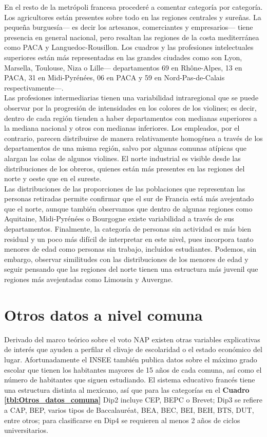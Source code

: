  En el resto de la metrópoli francesa procederé a comentar categoría por categoría. Los agricultores están presentes sobre todo en las regiones centrales y sureñas. La pequeña burguesía--- es decir los artesanos, comerciantes y empresarios--- tiene presencia en general nacional, pero resaltan las regiones de la costa mediterránea como PACA y Languedoc-Rousillon. Los cuadros y las profesiones intelectuales superiores están más representadas en las grandes ciudades como son Lyon, Marsella, Toulouse, Niza o Lille--- departamentos 69 en Rhône-Alpes, 13 en PACA, 31 en Midi-Pyrénées, 06 en PACA y 59 en Nord-Pas-de-Calais respectivamente---.\\ 
 
 Las profesiones intermediarias tienen una variabilidad intraregional que se puede observar por la progresión de intensidades en los colores de los violines; es decir, dentro de cada región tienden a haber departamentos con medianas superiores a la mediana nacional y otros con medianas inferiores. Los empleados, por el contrario, parecen distribuirse de manera relativamente homogénea a través de los departamentos de una misma región, salvo por algunas comunas atípicas que alargan las colas de algunos violines. El norte industrial es visible desde las distribuciones de los obreros, quienes están más presentes en las regiones del norte y oeste que en el sureste.\\
 
  Las distribuciones de las proporciones de las poblaciones que representan las personas retiradas permite confirmar que el sur de Francia está más avejentado que el norte, aunque también observamos que dentro de algunas regiones como Aquitaine, Midi-Pyrénées o Bourgogne existe variabilidad a través de sus departamentos. Finalmente, la categoría de personas sin actividad es más bien residual y un poco más difícil de interpretar en este nivel, pues incorpora tanto menores de edad como personas sin trabajo, incluidos estudiantes. Podemos, sin embargo, observar similitudes con las distribuciones de los menores de edad y seguir pensando que las regiones del norte tienen una estructura más juvenil que regiones más avejentadas como Limousin y Auvergne.\\

\clearpage
\section{Otros datos a nivel comuna}

Derivado del marco teórico sobre el voto NAP existen otras variables explicativas de interés que ayuden a perfilar el clivaje de escolaridad o el estado económico del lugar. Afortunadamente el INSEE también publica datos sobre el máximo grado escolar que tienen los habitantes mayores de 15 años de cada comuna, así como el número de habitantes que siguen estudiando. El sistema educativo francés tiene una estructura distinta al mexicano, así que para las categorías en el \textbf{Cuadro \ref{tbl:Otros_datos_comuna}} Dip2 incluye CEP, BEPC o Brevet; Dip3 se refiere a CAP, BEP, varios tipos de Baccalauréat, BEA, BEC, BEI, BEH, BTS, DUT, entre otros; para clasificarse en Dip4 se requieren al menos 2 años de ciclos universitarios.\\ 

